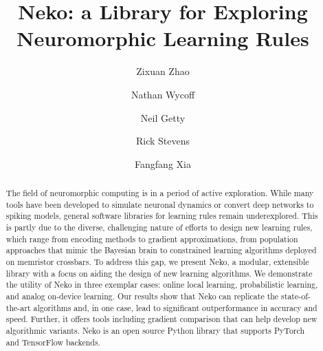 \documentclass[sigconf,dvipsnames]{acmart}
\begin{document}
\title{Neko: a Library for Exploring Neuromorphic Learning Rules}


\author{Zixuan Zhao}

\author{Nathan Wycoff}

\author{Neil Getty}

\author{Rick Stevens}

\author{Fangfang Xia}



\begin{abstract}
The field of neuromorphic computing is in a period of active exploration.
While many tools have been developed to simulate neuronal dynamics or convert deep networks to spiking models, general software libraries for learning rules remain underexplored.
This is partly due to the diverse, challenging nature of efforts to design new learning rules, which range from encoding methods to gradient approximations, from population approaches that mimic the Bayesian brain to constrained learning algorithms deployed on memristor crossbars.
To address this gap, we present Neko, a modular, extensible library with a focus on aiding the design of new learning algorithms.
We demonstrate the utility of Neko in three exemplar cases: online local learning, probabilistic learning, and analog on-device learning.
Our results show that Neko can replicate the state-of-the-art algorithms and, in one case, lead to significant outperformance in accuracy and speed.
Further, it offers tools including gradient comparison that can help develop new algorithmic variants.
Neko is an open source Python library that supports PyTorch and TensorFlow backends.
\end{abstract}
\end{document}
